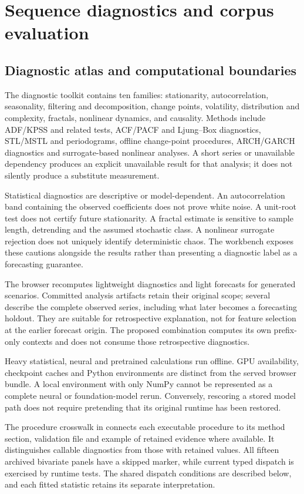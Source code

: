\documentclass[11pt,a4paper]{article}
\begin{document}
\section{Sequence diagnostics and corpus evaluation}
\label{sec:method-sequence}
\subsection{Diagnostic atlas and computational boundaries}
The diagnostic toolkit contains ten families: stationarity, autocorrelation, seasonality, filtering and decomposition, change points, volatility, distribution and complexity, fractals, nonlinear dynamics, and causality. Methods include ADF/KPSS and related tests, ACF/PACF and Ljung--Box diagnostics, STL/MSTL and periodograms, offline change-point procedures, ARCH/GARCH diagnostics and surrogate-based nonlinear analyses. A short series or unavailable dependency produces an explicit unavailable result for that analysis; it does not silently produce a substitute measurement.

Statistical diagnostics are descriptive or model-dependent. An autocorrelation band containing the observed coefficients does not prove white noise. A unit-root test does not certify future stationarity. A fractal estimate is sensitive to sample length, detrending and the assumed stochastic class. A nonlinear surrogate rejection does not uniquely identify deterministic chaos. The workbench exposes these cautions alongside the results rather than presenting a diagnostic label as a forecasting guarantee.

The browser recomputes lightweight diagnostics and light forecasts for generated scenarios. Committed analysis artifacts retain their original scope; several describe the complete observed series, including what later becomes a forecasting holdout. They are suitable for retrospective explanation, not for feature selection at the earlier forecast origin. The proposed combination computes its own prefix-only contexts and does not consume those retrospective diagnostics.

Heavy statistical, neural and pretrained calculations run offline. GPU availability, checkpoint caches and Python environments are distinct from the served browser bundle. A local environment with only NumPy cannot be represented as a complete neural or foundation-model rerun. Conversely, rescoring a stored model path does not require pretending that its original runtime has been restored.

The procedure crosswalk in  connects
each executable procedure to its method section, validation file and example
of retained evidence where available. It distinguishes callable diagnostics
from those with retained values. All fifteen archived bivariate panels have
a skipped marker, while current typed dispatch is exercised by runtime tests.
The shared dispatch conditions are described below, and each fitted
statistic retains its separate interpretation.
\end{document}

